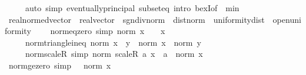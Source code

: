 \begin{isabellebody}
\ \ \ \ \ {\isacharparenleft}{\kern0pt}auto\ simp{\isacharcolon}{\kern0pt}\ eventually{\isacharunderscore}{\kern0pt}principal\ subset{\isacharunderscore}{\kern0pt}eq\ intro{\isacharcolon}{\kern0pt}\ bexI{\isacharbrackleft}{\kern0pt}of\ {\isacharunderscore}{\kern0pt}\ {\isachardoublequoteopen}min\ {\isacharunderscore}{\kern0pt}\ {\isacharunderscore}{\kern0pt}{\isachardoublequoteclose}{\isacharbrackright}{\kern0pt}{\isacharparenright}{\kern0pt}%
\endisatagproof
{\isafoldproof}%
%
\isadelimproof
\isanewline
%
\endisadelimproof
\isanewline
{}\isamarkupfalse%
\isanewline
\isanewline
{}\isamarkupfalse%
\ real{\isacharunderscore}{\kern0pt}normed{\isacharunderscore}{\kern0pt}vector\ {\isacharequal}{\kern0pt}\ real{\isacharunderscore}{\kern0pt}vector\ {\isacharplus}{\kern0pt}\ sgn{\isacharunderscore}{\kern0pt}div{\isacharunderscore}{\kern0pt}norm\ {\isacharplus}{\kern0pt}\ dist{\isacharunderscore}{\kern0pt}norm\ {\isacharplus}{\kern0pt}\ uniformity{\isacharunderscore}{\kern0pt}dist\ {\isacharplus}{\kern0pt}\ open{\isacharunderscore}{\kern0pt}uniformity\ {\isacharplus}{\kern0pt}\isanewline
\ \ \ norm{\isacharunderscore}{\kern0pt}eq{\isacharunderscore}{\kern0pt}zero\ {\isacharbrackleft}{\kern0pt}simp{\isacharbrackright}{\kern0pt}{\isacharcolon}{\kern0pt}\ {\isachardoublequoteopen}norm\ x\ {\isacharequal}{\kern0pt}\ {}\ {\isasymlongleftrightarrow}\ x\ {\isacharequal}{\kern0pt}\ {}{\isachardoublequoteclose}\isanewline
\ \ \ \ \ norm{\isacharunderscore}{\kern0pt}triangle{\isacharunderscore}{\kern0pt}ineq{\isacharcolon}{\kern0pt}\ {\isachardoublequoteopen}norm\ {\isacharparenleft}{\kern0pt}x\ {\isacharplus}{\kern0pt}\ y{\isacharparenright}{\kern0pt}\ {\isasymle}\ norm\ x\ {\isacharplus}{\kern0pt}\ norm\ y{\isachardoublequoteclose}\isanewline
\ \ \ \ \ norm{\isacharunderscore}{\kern0pt}scaleR\ {\isacharbrackleft}{\kern0pt}simp{\isacharbrackright}{\kern0pt}{\isacharcolon}{\kern0pt}\ {\isachardoublequoteopen}norm\ {\isacharparenleft}{\kern0pt}scaleR\ a\ x{\isacharparenright}{\kern0pt}\ {\isacharequal}{\kern0pt}\ {\isasymbar}a{\isasymbar}\ {\isacharasterisk}{\kern0pt}\ norm\ x{\isachardoublequoteclose}\isanewline
{}\isanewline
\isanewline
{}\isamarkupfalse%
\ norm{\isacharunderscore}{\kern0pt}ge{\isacharunderscore}{\kern0pt}zero\ {\isacharbrackleft}{\kern0pt}simp{\isacharbrackright}{\kern0pt}{\isacharcolon}{\kern0pt}\ {\isachardoublequoteopen}{}\ {\isasymle}\ norm\ x{\isachardoublequoteclose}\isanewline
%
\isadelimproof
%
\endisadelimproof

\end{isabellebody}
